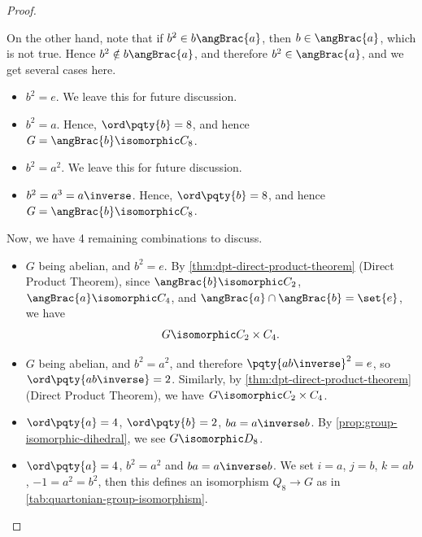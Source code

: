 \begin{proof}
\begin{itemize}
        On the other hand, note that if \(b^2 \in b \angBrac{a}\), then \(b \in \angBrac{a}\), which is not true. Hence \(b^2 \notin b \angBrac{a}\), and therefore \(b^2 \in \angBrac{a}\), and we get several cases here.
        \begin{itemize}
            \item \(b^2 = e\). We leave this for future discussion.
            \item \(b^2 = a\). Hence, \(\ord\pqty{b} = 8\), and hence \(G = \angBrac{b} \isomorphic C_8\).
            \item \(b^2 = a^2\). We leave this for future discussion.
            \item \(b^2 = a^3 = a\inverse\). Hence, \(\ord\pqty{b} = 8\), and hence \(G = \angBrac{b} \isomorphic C_8\).
        \end{itemize}

        Now, we have 4 remaining combinations to discuss.
        \begin{itemize}
            \item \(G\) being abelian, and \(b^2 = e\). By \autoref{thm:dpt-direct-product-theorem} (Direct Product Theorem), since \(\angBrac{b} \isomorphic C_2\), \(\angBrac{a} \isomorphic C_4\), and \(\angBrac{a} \cap \angBrac{b} = \set{e}\), we have
            \[
                G \isomorphic C_2 \times C_4.
            \]
            \item \(G\) being abelian, and \(b^2 = a^2\), and therefore \(\pqty{a b \inverse}^2 = e\), so \(\ord \pqty{a b \inverse} = 2\). Similarly, by \autoref{thm:dpt-direct-product-theorem} (Direct Product Theorem), we have \(G \isomorphic C_2 \times C_4\).
            \item \(\ord\pqty{a} = 4\), \(\ord\pqty{b} = 2\), \(ba = a\inverse b\). By \autoref{prop:group-isomorphic-dihedral}, we see \(G \isomorphic D_8\).
            \item \(\ord\pqty{a} = 4\), \(b^2 = a^2\) and \(b a = a \inverse b\). We set \(i = a\), \(j = b\), \(k = ab\), \(-1 = a^2 = b^2\), then this defines an isomorphism \(Q_8 \to G\) as in \autoref{tab:quartonian-group-isomorphism}.


\end{itemize}
\end{itemize}
\end{proof}
